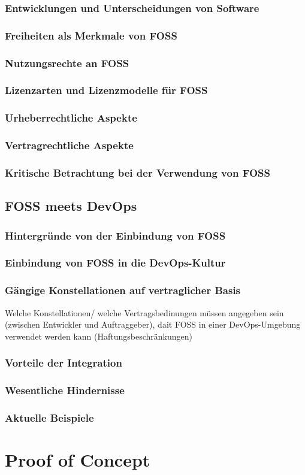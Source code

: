 \documentclass[12pt,titlepage]{article}
\begin{document}
\subsubsection{Entwicklungen und Unterscheidungen von Software}
\subsubsection{Freiheiten als Merkmale von FOSS}
\subsubsection{Nutzungsrechte an FOSS}
\subsubsection{Lizenzarten und Lizenzmodelle für FOSS}
\subsubsection{Urheberrechtliche Aspekte}
\subsubsection{Vertragrechtliche Aspekte}
\subsubsection{Kritische Betrachtung bei der Verwendung von FOSS}

\subsection{FOSS meets DevOps}
\subsubsection{Hintergründe von der Einbindung von FOSS}
\subsubsection{Einbindung von FOSS in die DevOps-Kultur}
\subsubsection{Gängige Konstellationen auf vertraglicher Basis}
Welche Konstellationen/ welche Vertragsbedinungen müssen angegeben sein (zwischen Entwickler und Auftraggeber), dait FOSS in einer DevOps-Umgebung verwendet werden kann (Haftungsbeschränkungen)
\subsubsection{Vorteile der Integration}
\subsubsection{Wesentliche Hindernisse}
\subsubsection{Aktuelle Beispiele}




\section{Proof of Concept}



\newpage


\end{document}
